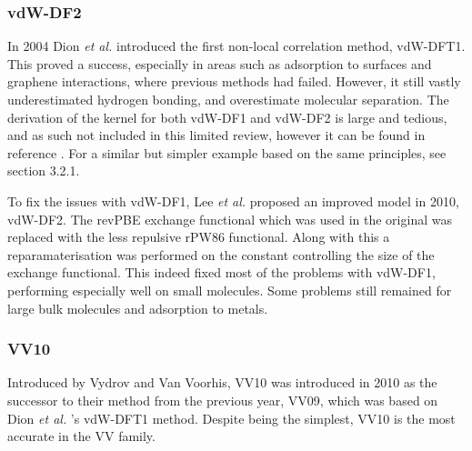 \documentclass[10pt,a4paper,twocolumn,twoside]{extarticle}
\newcommand{\al}{\emph{et al. }}
\begin{document}
	\subsubsection{vdW-DF2}
	In 2004 Dion \al introduced the first non-local correlation method, vdW-DFT1.\cite{vdw04Original-Dion2004} This proved a success, especially in areas such as adsorption to surfaces and graphene interactions, where previous methods had failed.\cite{vdW-review} However, it still vastly underestimated hydrogen bonding, and overestimate molecular separation. The derivation of the kernel for both vdW-DF1 and vdW-DF2 is large and tedious, and as such not included in this limited review, however it can be found in reference \cite{vdw04Original-Dion2004}. For a similar but simpler example based on the same principles, see section 3.2.1.

	To fix the issues with vdW-DF1, Lee \al proposed an improved model in 2010, vdW-DF2.\cite{Lee2010-vdW-DF2-Original} The revPBE\cite{revPBE} exchange functional which was used in the original was replaced with the less repulsive rPW86 functional.\cite{rPW86} Along with this a reparamaterisation was performed on the constant controlling the size of the exchange functional. This indeed fixed most of the problems with vdW-DF1, performing especially well on small molecules. Some problems still remained for large bulk molecules and adsorption to metals. 


	\subsubsection{VV10}
	\label{sec:VV10}
	Introduced by Vydrov and Van Voorhis, VV10 was introduced in 2010 as the successor to their method from the previous year, VV09, which was based on Dion \al's vdW-DFT1 method.\cite{VV09Original-Vydrov2009,Vydrov2010} 
	Despite being the simplest, VV10 is the most accurate in the VV family.\cite{Grimme2011}
\end{document}
